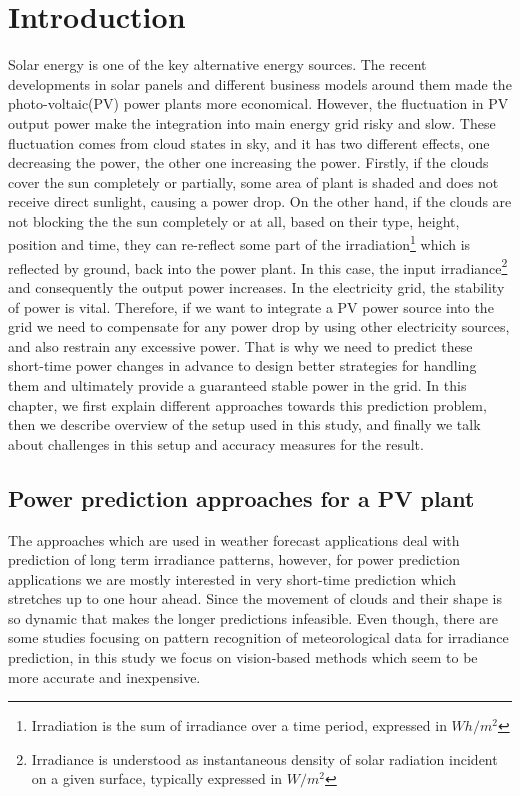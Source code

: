 \newcommand{\package}{\emph}
\chapter{Introduction}
Solar energy is one of the key alternative energy sources. The recent developments in solar panels and different business models around them made the photo-voltaic(PV) power plants more economical. However, the fluctuation in PV output power make the integration into main energy grid risky and slow. These fluctuation comes from cloud states in sky, and it has two different effects, one decreasing the power, the other one increasing the power. Firstly, if the clouds cover the sun completely or partially, some area of plant is shaded and does not receive direct sunlight, causing a power drop. On the other hand, if the clouds are not blocking the the sun completely or at all, based on their type, height, position and time, they can re-reflect some part of the irradiation\footnote{Irradiation is the sum of irradiance over a time period, expressed in  $Wh/m^2$} which is reflected by ground, back into the power plant. In this case, the input irradiance\footnote{Irradiance is understood as instantaneous density of solar radiation incident on a given surface, typically expressed in $W/m^2$} and consequently the output power increases. In the electricity grid, the stability of power is vital. Therefore, if we want to integrate a PV power source into the grid we need to compensate for any power drop by using other electricity sources, and also restrain any excessive power. That is why we need to predict these short-time power changes in advance to design better strategies for handling them and ultimately provide a guaranteed stable power in the grid. In this chapter, we first explain different approaches towards this prediction problem, then we describe overview of the setup used in this study, and finally we talk about challenges in this setup and  accuracy measures for the result. 


\section{Power prediction approaches for a PV plant}
\label{sec:overview}
The approaches which are used in weather forecast applications deal with prediction of long term irradiance patterns, however, for power prediction applications we are mostly interested in very short-time prediction which stretches up to one hour ahead. Since the movement of clouds and their shape is so dynamic that makes the longer predictions infeasible. Even though, there are some studies focusing on pattern recognition of meteorological data for irradiance prediction, in this study we focus on vision-based methods which seem to be more accurate and inexpensive.
